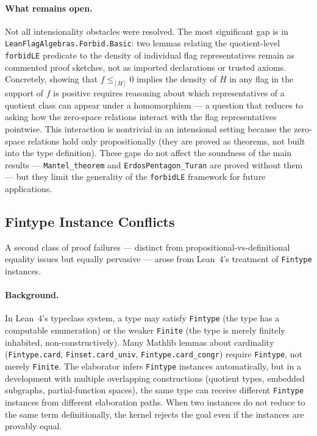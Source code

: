 \documentclass{article}
\newcommand{\lean}[1]{\texttt{#1}}
\begin{document}
\paragraph{What remains open.}
Not all intensionality obstacles were resolved.  The most significant gap is in
\lean{LeanFlagAlgebras.Forbid.Basic}: two lemmas relating the quotient-level
\lean{forbidLE} predicate to the density of individual flag representatives
remain as commented proof sketches, not as imported declarations or trusted
axioms.  Concretely, showing that
$f \leq_{[H]} 0$ implies the density of $H$ in any flag in the support of $f$
is positive requires reasoning about which representatives of a quotient class
can appear under a homomorphism --- a question that reduces to asking how the
zero-space relations interact with the flag representatives pointwise.  This
interaction is nontrivial in an intensional setting because the zero-space
relations hold only propositionally (they are proved as theorems, not built into
the type definition).  These gaps do not affect the soundness of the main
results --- \lean{Mantel\_theorem} and \lean{ErdosPentagon\_Turan} are proved
without them --- but they limit the generality of the \lean{forbidLE} framework
for future applications.

\subsection{Fintype Instance Conflicts}
\label{sec:fintype}

A second class of proof failures --- distinct from propositional-vs-definitional
equality issues but equally pervasive --- arose from Lean~4's treatment of
\lean{Fintype} instances.

\paragraph{Background.}
In Lean~4's typeclass system, a type may satisfy \lean{Fintype} (the type has a
computable enumeration) or the weaker \lean{Finite} (the type is merely
finitely inhabited, non-constructively).  Many Mathlib lemmas about cardinality
(\lean{Fintype.card}, \lean{Finset.card\_univ}, \lean{Fintype.card\_congr})
require \lean{Fintype}, not merely \lean{Finite}.  The elaborator infers
\lean{Fintype} instances automatically, but in a development with multiple
overlapping constructions (quotient types, embedded subgraphs, partial-function
spaces), the same type can receive different \lean{Fintype} instances from
different elaboration paths.  When two instances do not reduce to the same term
definitionally, the kernel rejects the goal even if the instances are provably
equal.
\end{document}
